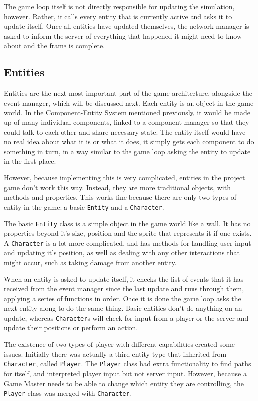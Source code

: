 The game loop itself is not directly responsible for updating the simulation, however. Rather, it calls every entity that is currently active and asks it to update itself. Once all entities have updated themselves, the network manager is asked to inform the server of everything that happened it might need to know about and the frame is complete.

\subsection{Entities}
Entities are the next most important part of the game architecture, alongside the event manager, which will be discussed next. Each entity is an object in the game world. In the Component-Entity System mentioned previously, it would be made up of many individual components, linked to a component manager so that they could talk to each other and share necessary state. The entity itself would have no real idea about what it is or what it does, it simply gets each component to do something in turn, in a way similar to the game loop asking the entity to update in the first place.

However, because implementing this is very complicated, entities in the project game don't work this way. Instead, they are more traditional objects, with methods and properties. This works fine because there are only two types of entity in the game: a basic \texttt{Entity} and a \texttt{Character}.

The basic \texttt{Entity} class is a simple object in the game world like a wall. It has no properties beyond it's size, position and the sprite that represents it if one exists. A \texttt{Character} is a lot more complicated, and has methods for handling user input and updating it's position, as well as dealing with any other interactions that might occur, such as taking damage from another entity.

When an entity is asked to update itself, it checks the list of events that it has received from the event manager since the last update and runs through them, applying a series of functions in order. Once it is done the game loop asks the next entity along to do the same thing. Basic entities don't do anything on an update, whereas \texttt{Character}s will check for input from a player or the server and update their positions or perform an action.

The existence of two types of player with different capabilities created some issues. Initially there was actually a third entity type that inherited from \texttt{Character}, called \texttt{Player}. The \texttt{Player} class had extra functionality to find paths for itself, and interpreted player input but not server input. However, because a Game Master needs to be able to change which entity they are controlling, the \texttt{Player} class was merged with \texttt{Character}.

